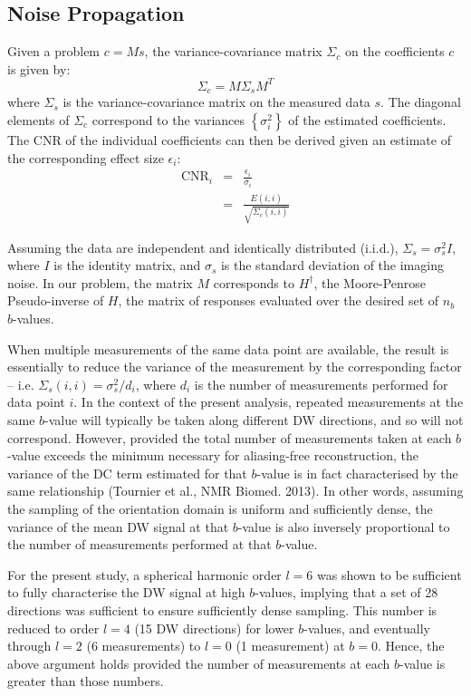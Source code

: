 \documentclass{article}
\newcommand{\cnr}{\textrm{CNR}}
\begin{document}
\subsection{Noise Propagation}
Given a problem $c = M s$, the variance-covariance matrix $\Sigma_c$ on the coefficients $c$ is given by:
\begin{equation}
\label{noise_prop}
\Sigma_c = M \Sigma_s M^T 
\end{equation}
where $\Sigma_s$ is the variance-covariance matrix on the measured data $s$.
The diagonal elements of $\Sigma_c$ correspond to the variances 
$\left\{ \sigma_i^2 \right\}$ of the estimated coefficients. The CNR of the
individual coefficients can then be derived given an estimate of the
corresponding effect size $\epsilon_i$:
\begin{eqnarray}
\cnr_i & = & \frac{\epsilon_i}{\sigma_i} \\
& = & \frac{E(i,i)}{\sqrt{\Sigma_c(i,i)}}
\end{eqnarray}

Assuming the data are independent and identically distributed (i.i.d.),
$\Sigma_s = \sigma_s^2 I$, where $I$ is the identity matrix, and $\sigma_s$ is
the standard deviation of the imaging noise. In our problem, the matrix $M$
corresponds to $H^\dagger$, the Moore-Penrose Pseudo-inverse of $H$, the matrix
of responses evaluated over the desired set of $n_b$ $b$-values.

When multiple measurements of the same data point are available, the result is
essentially to reduce the variance of the measurement by the corresponding
factor -- i.e. $\Sigma_s(i,i) = \sigma_s^2 / d_i$, where $d_i$ is the number of
measurements performed for data point $i$. In the context of the present
analysis, repeated measurements at the same $b$-value will typically be taken
along different DW directions, and so will not correspond. However, provided
the total number of measurements taken at each $b$-value exceeds the minimum
necessary for aliasing-free reconstruction, the variance of the DC term
estimated for that $b$-value is in fact characterised by the same relationship
(Tournier et al., NMR Biomed. 2013). In other words, assuming the sampling of
the orientation domain is uniform and sufficiently dense, the variance of the
mean DW signal at that $b$-value is also inversely proportional to the
number of measurements performed at that $b$-value. 

For the present study, a spherical harmonic order $l = 6$ was shown to be
sufficient to fully characterise the DW signal at high $b$-values, implying
that a set of 28 directions was sufficient to ensure sufficiently dense
sampling. This number is reduced to order $l=4$ (15 DW directions) for lower
$b$-values, and eventually through $l=2$ (6 measurements) to $l=0$ (1 
measurement) at $b=0$. Hence, the above argument holds provided the number of 
measurements at each $b$-value is greater than those numbers. 
\end{document}
